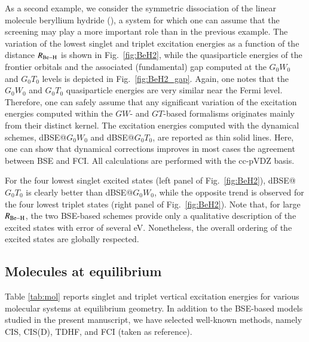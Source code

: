 \documentclass[aip,jcp,reprint,noshowkeys,superscriptaddress]{revtex4-1}
\begin{document}
As a second example, we consider the symmetric dissociation of the linear molecule beryllium hydride (), a system for which one can assume that the screening may play a more important role than in the previous example.
The variation of the lowest singlet and triplet excitation energies as a function of the distance $R_{\ce{Be-H}}$ is shown in Fig.~\ref{fig:BeH2}, while the quasiparticle energies of the frontier orbitals and the associated (fundamental) gap computed at the $G_0W_0$ and $G_0T_0$ levels is depicted in Fig.~\ref{fig:BeH2_gap}.
Again, one notes that the $G_0W_0$ and $G_0T_0$ quasiparticle energies are very similar near the Fermi level.
Therefore, one can safely assume that any significant variation of the excitation energies computed within the $GW$- and $GT$-based formalisms originates mainly from their distinct kernel.
The excitation energies computed with the dynamical schemes, dBSE@$G_0W_0$ and dBSE@$G_0T_0$, are reported as thin solid lines.
Here, one can show that dynamical corrections improves in most cases the agreement between BSE and FCI.
All calculations are performed with the cc-pVDZ basis.

For the four lowest singlet excited states (left panel of Fig.~\ref{fig:BeH2}), dBSE@$G_0T_0$ is clearly better than dBSE@$G_0W_0$, while the opposite trend is observed for the four lowest triplet states (right panel of Fig.~\ref{fig:BeH2}).
Note that, for large $R_{\ce{Be-H}}$, the two BSE-based schemes provide only a qualitative description of the excited states with error of several \si{\eV}.
Nonetheless, the overall ordering of the excited states are globally respected.

\subsection{Molecules at equilibrium}
\label{sec:mol}

Table \ref{tab:mol} reports singlet and triplet vertical excitation energies for various molecular systems at equilibrium geometry.
In addition to the BSE-based models studied in the present manuscript, we have selected well-known methods, namely CIS, CIS(D), TDHF, and FCI (taken as reference).
\end{document}
